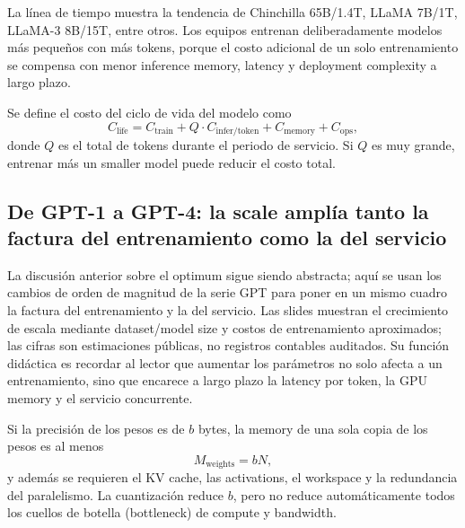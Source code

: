 La línea de tiempo muestra la tendencia de Chinchilla 65B/1.4T, LLaMA 7B/1T, LLaMA-3 8B/15T, entre otros. Los equipos entrenan deliberadamente modelos más pequeños con más tokens, porque el costo adicional de un solo entrenamiento se compensa con menor inference memory, latency y deployment complexity a largo plazo.


Se define el costo del ciclo de vida del modelo como
\[
C_{\text{life}}=C_{\text{train}}+Q\cdot C_{\text{infer/token}}+C_{\text{memory}}+C_{\text{ops}},
\]
donde $Q$ es el total de tokens durante el periodo de servicio. Si $Q$ es muy grande, entrenar más un smaller model puede reducir el costo total.


\subsection{De GPT-1 a GPT-4: la scale amplía tanto la factura del entrenamiento como la del servicio}

La discusión anterior sobre el optimum sigue siendo abstracta; aquí se usan los cambios de orden de magnitud de la serie GPT para poner en un mismo cuadro la factura del entrenamiento y la del servicio. Las slides muestran el crecimiento de escala mediante dataset/model size y costos de entrenamiento aproximados; las cifras son estimaciones públicas, no registros contables auditados. Su función didáctica es recordar al lector que aumentar los parámetros no solo afecta a un entrenamiento, sino que encarece a largo plazo la latency por token, la GPU memory y el servicio concurrente.



Si la precisión de los pesos es de $b$ bytes, la memory de una sola copia de los pesos es al menos
\[
M_{\text{weights}}=bN,
\]
y además se requieren el KV cache, las activations, el workspace y la redundancia del paralelismo. La cuantización reduce $b$, pero no reduce automáticamente todos los cuellos de botella (bottleneck) de compute y bandwidth.

